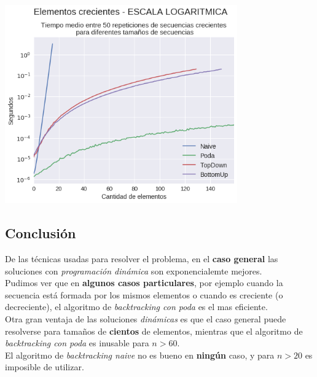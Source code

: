 {\centering
  \includegraphics[width=0.75\textwidth]{informe/img/experimentos/todos-creciente-logaritmica.png} \\
}

\subsection{Conclusión}

De las técnicas usadas para resolver el problema, en el \textbf{caso general} las soluciones con \textit{programación dinámica} son exponencialemte mejores. \\

Pudimos ver que en \textbf{algunos casos particulares}, por ejemplo cuando la secuencia está formada por los mismos elementos o cuando es creciente (o decreciente), el algoritmo de \textit{backtracking con poda} es el mas eficiente.  \\

Otra gran ventaja de las soluciones \textit{dinámicas} es que el caso general puede resolverse para tamaños de \textbf{cientos} de elementos, mientras que el algoritmo de \textit{backtracking con poda} es inusable para $n > 60$.  \\

El algoritmo de \textit{backtracking naive} no es bueno en \textbf{ningún} caso, y para $n > 20$ es imposible de utilizar. \\